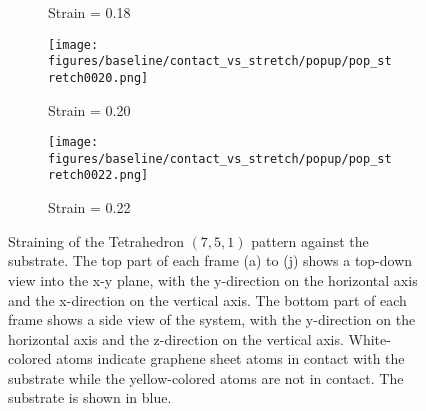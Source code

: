 \begin{figure}[H]
\begin{subfigure}[b]{0.49\textwidth}
        \caption{Strain = 0.18}
    \end{subfigure}
    \begin{subfigure}[b]{0.49\textwidth}
        \centering
        \texttt{[image: figures/baseline/contact\_vs\_stretch/popup/pop\_stretch0020.png]}
        \caption{Strain = 0.20}
    \end{subfigure}
    \begin{subfigure}[b]{0.49\textwidth}
        \centering
        \texttt{[image: figures/baseline/contact\_vs\_stretch/popup/pop\_stretch0022.png]}
        \caption{Strain = 0.22}
        \label{fig:tetrahedron_strain_j}
    \end{subfigure}
    \hfill
       \caption{Straining of the Tetrahedron $(7,5,1)$ pattern against the substrate. The top part of each frame (a) to (j) shows a top-down view into the x-y plane, with the y-direction on the horizontal axis and the x-direction on the vertical axis. The bottom part of each frame shows a side view of the system, with the y-direction on the horizontal axis and the z-direction on the vertical axis. White-colored atoms indicate graphene sheet atoms in contact with the substrate while the yellow-colored atoms are not in contact. The substrate is shown in blue. }
       \label{fig:tetrahedron_strain}
  \end{figure}
  \pagebreak


